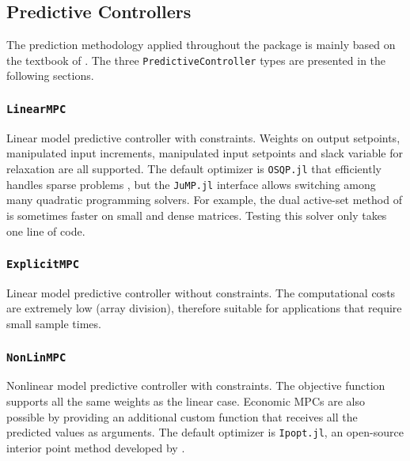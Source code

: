 \subsection{Predictive Controllers}

The prediction methodology applied throughout the package is mainly based on the textbook of \citet{mpcMac}. The three \texttt{PredictiveController} types are presented in the following sections.

\subsubsection{\textnormal{\texttt{LinearMPC}}}
Linear model predictive controller with constraints. Weights on output setpoints, manipulated input increments, manipulated input setpoints and slack variable for relaxation are all supported. The default optimizer is \texttt{OSQP.jl} that efficiently handles sparse problems \citep{osqp}, but the \texttt{JuMP.jl} interface allows switching among many quadratic programming solvers. For example, the dual active-set method of \citet{daqp} is sometimes faster on small and dense matrices. Testing this solver only takes one line of code.

\subsubsection{\textnormal{\texttt{ExplicitMPC}}}
Linear model predictive controller without constraints. The computational costs are extremely low (array division), therefore suitable for applications that require small sample times.

\subsubsection{\textnormal{\texttt{NonLinMPC}}}
Nonlinear model predictive controller with constraints. The objective function supports all the same weights as the linear case. Economic MPCs are also possible by providing an additional custom function that receives all the predicted values as arguments. The default optimizer is \texttt{Ipopt.jl}, an open-source interior point method developed by \citet{ipopt}.


